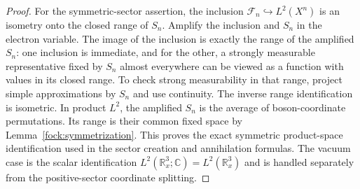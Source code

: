 \documentclass[11pt,a4paper]{article}
\theoremstyle{definition}
\theoremstyle{remark}
\begin{document}
\begin{proof}
For the symmetric-sector assertion, the inclusion
$\mathcal F_n\hookrightarrow L^2(X^n)$ is an isometry onto the
closed range of $S_n$. Amplify the inclusion and $S_n$ in the electron
variable. The image of the inclusion is exactly the range of the
amplified $S_n$: one inclusion is immediate, and for the other,
a strongly measurable representative fixed by $S_n$ almost everywhere
can be viewed as a function with values in its closed range. To check
strong measurability in that range, project simple approximations by
$S_n$ and use continuity. The inverse range identification is
isometric. In product $L^2$, the amplified $S_n$ is the average of
boson-coordinate permutations. Its range is their common fixed space
by Lemma~\ref{fock:symmetrization}. This proves the exact symmetric
product-space identification used in the sector creation and
annihilation formulas. The vacuum case is the scalar identification
$L^2(\mathbb R^3_x;\mathbb C)=L^2(\mathbb R^3_x)$ and is handled
separately from the positive-sector coordinate splitting.
\end{proof}
\end{document}

